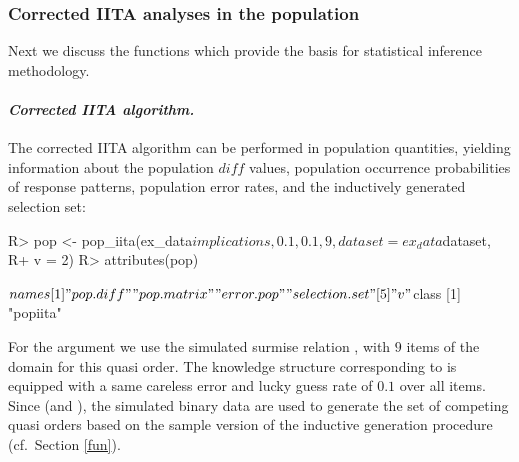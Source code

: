 \documentclass[nojss]{jss}
\begin{document}
\subsubsection{Corrected IITA analyses in the population}

Next we discuss the functions which provide the basis for statistical inference methodology. 

\paragraph{\it Corrected IITA algorithm.}
The corrected IITA algorithm can be performed in population quantities, yielding information 
about the population $\mathit{diff}$ values, population occurrence probabilities of response 
patterns, population error rates, and the inductively generated selection set:
\begin{Schunk}
\begin{Sinput}
R> pop <- pop_iita(ex_data$implications, 0.1, 0.1, 9, dataset = ex_data$dataset, 
R+    v = 2)
R> attributes(pop)
\end{Sinput}
\begin{Soutput}
$names
[1] "pop.diff"      "pop.matrix"    "error.pop"     "selection.set"
[5] "v"            

$class
[1] "popiita"
\end{Soutput}
\end{Schunk}
For the argument  we use the simulated surmise relation , 
with $9$ items of the domain for this quasi order. The knowledge structure corresponding 
to  is equipped with a same careless error and lucky guess rate 
of $0.1$ over all items. Since  (and ), 
the simulated binary data are used to generate the set of competing quasi orders based 
on the sample version of the inductive generation procedure (cf.\ Section \ref{fun}).
\end{document}

